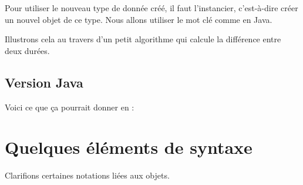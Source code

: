 		Pour utiliser le nouveau type de donnée créé,
		il faut l'instancier, c'est-à-dire créer un nouvel objet de ce type.
		Nous allons utiliser le mot clé \lda{\New} comme en Java.
		
		Illustrons cela au travers d'un petit algorithme
		qui calcule la différence entre deux durées.
		
		\begin{algo}
		\end{algo}

	\subsection{Version Java}

	Voici ce que ça pourrait donner en  :

\section{Quelques éléments de syntaxe}

	Clarifions certaines notations liées aux objets.


